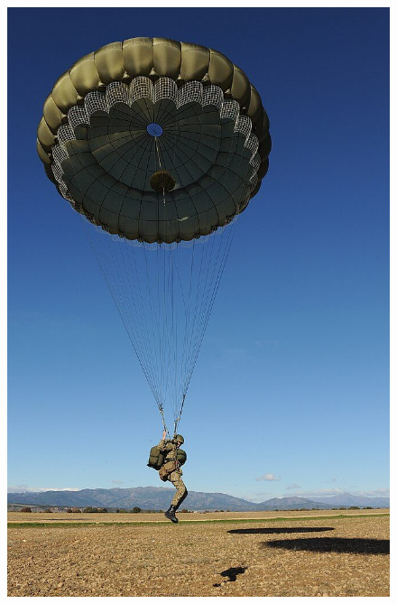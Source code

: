 	\begin{figure}[H]
	\begin{minipage}[c]{0.35\linewidth}
	\includegraphics[width=\linewidth]{01-EtudeAeronefs/img/paraMili.jpg}
	\end{minipage}
	\hfill
	\begin{minipage}[c]{0.35\linewidth}

\end{minipage}
\end{figure}
